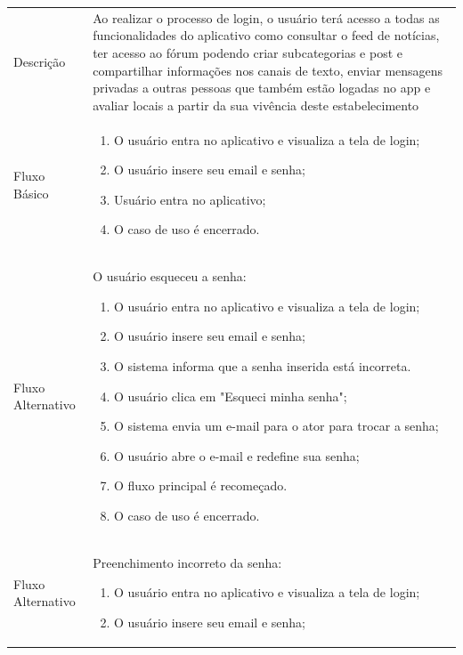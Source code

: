 \begin{quadro}[htb]
	\centering
	\ABNTEXfontereduzida
	\caption[Caso de Uso Fazer Login]{Caso de Uso Fazer Login}
	\label{casos-de-uso1}
\end{quadro}
\begin{longtable}{|p{3.3cm}|p{12.3cm}|}
	\hline
	\thead{} & \thead{Ator} \\
	\hline
	Descrição & Ao realizar o processo de login, o usuário terá acesso a todas as funcionalidades do aplicativo como consultar o feed de notícias, ter acesso ao fórum podendo criar subcategorias e post e compartilhar informações nos canais de texto, enviar mensagens privadas a outras pessoas que também estão logadas no app e avaliar locais a partir da sua vivência deste estabelecimento \\
	\hline
	Fluxo Básico  & 
	\begin{enumerate}
		\item O usuário entra no aplicativo e visualiza a tela de login;
		\item O usuário insere seu email e senha;
		\item Usuário entra no aplicativo;
		\item O caso de uso é encerrado. 
	\end{enumerate}\\
	\hline
	Fluxo Alternativo  & O usuário esqueceu a senha:
	\begin{enumerate}
		\item O usuário entra no aplicativo e visualiza a tela de login;
		\item O usuário insere seu email e senha;
		\item O sistema informa que a senha inserida está incorreta.
		\item O usuário clica em "Esqueci minha senha";
		\item O sistema envia um e-mail para o ator para trocar a senha;
		\item O usuário abre o e-mail e redefine sua senha;
		\item O fluxo principal é recomeçado.
		\item O caso de uso é encerrado.
	\end{enumerate} \\
	\hline
	Fluxo Alternativo  &  Preenchimento incorreto da senha:
	\begin{enumerate}
		\item O usuário entra no aplicativo e visualiza a tela de login;
		\item O usuário insere seu email e senha;

\end{enumerate}
\end{longtable}
